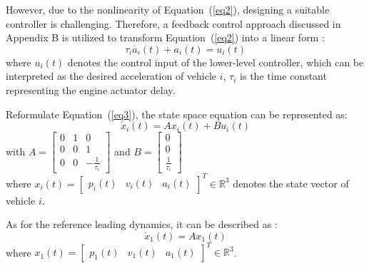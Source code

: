 \documentclass[a4paper]{cas-sc}
\begin{document}
However, due to the nonlinearity of Equation~(\ref{eq2}), designing a suitable controller is challenging. Therefore, a feedback control approach discussed in Appendix B is utilized to transform Equation~(\ref{eq2}) into a linear form \citep{Wang2018}:
\begin{equation}
  \tau_i\dot{a_i}\left(t\right)+a_i\left(t\right)=u_i(t)
  \label{eq3}
\end{equation}
where $u_i(t)$ denotes the control input of the lower-level controller, which can be interpreted as the desired acceleration of vehicle $i$, $\tau_i$ is the time constant representing the engine actuator delay.

Reformulate Equation~(\ref{eq3}), the state space equation can be represented as:
\begin{equation}
  {\dot x_i}\left( t \right) = A{x_i}\left( t \right) + B{u_i}\left( t \right)
  \label{eq4}
\end{equation}
with $A = \left[ {\begin{array}{*{20}{c}}
          0 & 1 & 0                          \\
          0 & 0 & 1                          \\
          0 & 0 & { - \frac{1}{{{\tau _i}}}}
        \end{array}} \right]$ and $B = \left[ {\begin{array}{*{20}{c}}
          0 \\
          0 \\
          {\frac{1}{{{\tau _i}}}}
        \end{array}} \right]$\\
where ${x_i}\left( t \right) = {\left[ {\begin{array}{*{20}{c}}
          {{p_i}\left( t \right)} & {{v_i}\left( t \right)} & {{a_i}\left( t \right)}
        \end{array}} \right]^T} \in {\mathbb{R}^3}$ denotes the state vector of vehicle $i$.

As for the reference leading dynamics, it can be described as \citep{Hengster-Movric2015}:
\begin{equation}
  {\dot x_1}\left( t \right) = A{x_1}\left( t \right)
  \label{eq6}
\end{equation}
where ${x_1}\left( t \right) = {\left[ {\begin{array}{*{20}{c}}
          {{p_1}\left( t \right)} & {{v_1}\left( t \right)} & {{a_1}\left( t \right)}
        \end{array}} \right]^T} \in {\mathbb{R}^3}$.
\end{document}
